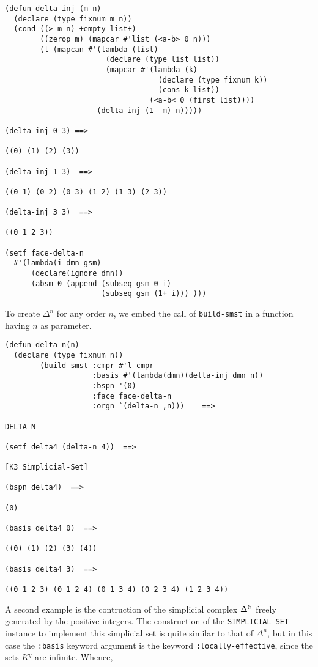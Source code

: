 {\footnotesize \begin{verbatim}
(defun delta-inj (m n)
  (declare (type fixnum m n))
  (cond ((> m n) +empty-list+)
        ((zerop m) (mapcar #'list (<a-b> 0 n)))
        (t (mapcan #'(lambda (list)
                       (declare (type list list))
                       (mapcar #'(lambda (k)
                                   (declare (type fixnum k))
                                   (cons k list))
                                 (<a-b< 0 (first list))))
                     (delta-inj (1- m) n)))))

(delta-inj 0 3) ==>

((0) (1) (2) (3))

(delta-inj 1 3)  ==>

((0 1) (0 2) (0 3) (1 2) (1 3) (2 3))

(delta-inj 3 3)  ==>

((0 1 2 3))

(setf face-delta-n
  #'(lambda(i dmn gsm)
      (declare(ignore dmn))
      (absm 0 (append (subseq gsm 0 i)
                      (subseq gsm (1+ i))) )))
\end{verbatim}}
To create $\Delta^n$ for any order $n$, we embed the call of {\tt build-smst} in a function having
$n$ as parameter.
{\footnotesize \begin{verbatim}
(defun delta-n(n)
  (declare (type fixnum n))
        (build-smst :cmpr #'l-cmpr
                    :basis #'(lambda(dmn)(delta-inj dmn n))
                    :bspn '(0)
                    :face face-delta-n
                    :orgn `(delta-n ,n)))    ==>

DELTA-N

(setf delta4 (delta-n 4))  ==>

[K3 Simplicial-Set]

(bspn delta4)  ==>

(0)

(basis delta4 0)  ==>

((0) (1) (2) (3) (4))

(basis delta4 3)  ==>

((0 1 2 3) (0 1 2 4) (0 1 3 4) (0 2 3 4) (1 2 3 4))
\end{verbatim}}
\vskip 0.40cm
A second example is the contruction of the simplicial complex  $\Delta^{{\mathbb{N}}}$ freely generated
by the positive integers. The construction of the {\tt SIMPLICIAL-SET} instance to implement this
simplicial set is quite similar to that of $\Delta^n$, but in this case the {\tt :basis} keyword
argument is  the keyword {\tt :locally-effective}, since the sets $K^q$ are infinite. Whence,
